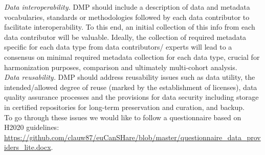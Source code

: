 \documentclass{article}
\begin{document}
\textit{Data interoperability.}
DMP should include a description of data and metadata vocabularies, standards or methodologies followed by each data contributor to facilitate interoperability. To this end, an initial collection of this info from each data contributor will be valuable. Ideally, the collection of required metadata specific for each data type from data contributors/ experts will lead to a consensus on minimal required metadata collection for each data type, crucial for harmonization purposes, comparison and ultimately multi-cohort analysis.\\

\textit{Data reusability.}
DMP should address reusability issues such as data utility, the intended/allowed degree of reuse (marked by the establishment of licenses), data quality assurance processes and the provisions for data security including storage in certified repositories for long-term preservation and curation, and backup.\\
 


To go through these issues we would like to follow a questionnaire based on H2020 guidelines: \url{https://github.com/clauw87/euCanSHare/blob/master/questionnaire_data_providers_lite.docx}. 
\end{document}
